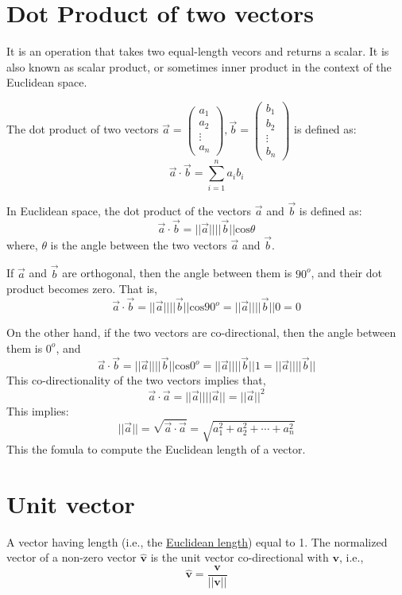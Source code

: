 \documentclass[conference,final,11pt,technote,onecolumn]{IEEEtran}\usepackage[]{graphicx}\usepackage[]{color}
\begin{document}
	\section{Dot Product of two vectors}
	\label{term:dot_product}
It is an operation that takes two equal-length vecors and returns a scalar. It is also known as scalar product, or sometimes inner product in the context of the Euclidean space.

The dot product of two vectors $\vec a=\begin{pmatrix}a_1\\a_2\\\vdots\\a_n\end{pmatrix}, \vec b=\begin{pmatrix}b_1\\b_2\\\vdots\\b_n\end{pmatrix}$ is defined as:
\[ \vec a \cdot \vec b = \sum_{i=1}^n a_ib_i\]

In Euclidean space, the dot product of the vectors $\vec a$ and $\vec b$ is defined as:
\[ \vec a \cdot \vec b = ||\vec a||||\vec b||\text{cos}\theta \]
where, $\theta$ is the angle between the two vectors $\vec a$ and $\vec b$.

If $\vec a$ and $\vec b$ are orthogonal, then the angle between them is $90^o$, and their dot product becomes zero. That is,
\[ \vec a \cdot \vec b = ||\vec a||||\vec b||\text{cos}90^o  = ||\vec a||||\vec b||0 = 0\]

On the other hand, if the two vectors are co-directional, then the angle between them is $0^o$, and
\[ \vec a \cdot \vec b = ||\vec a||||\vec b||\text{cos}0^o  = ||\vec a||||\vec b||1 = ||\vec a||||\vec b||\]
This co-directionality of the two vectors implies that, 
\[ \vec a \cdot \vec a = ||\vec a||||\vec a|| = ||\vec a||^2 \]
This implies:
\[ ||\vec a|| = \sqrt{\vec a \cdot \vec a} = \sqrt{a^2_1+a^2_2+\cdots+a^2_n} \]
This the fomula to compute the Euclidean length of a vector.

	\section{Unit vector}
	\label{term:unit_vector}
A vector having length (i.e., the \hyperref[term:dot_product]{Euclidean length}) equal to 1.
The normalized vector of a non-zero vector $\hat{\mathbf{v}}$ is the unit vector co-directional with $\mathbf{v}$, i.e.,
\[ \hat{\mathbf{v}} = \dfrac{\mathbf{v}}{||\mathbf{v}||} \]
\end{document}
